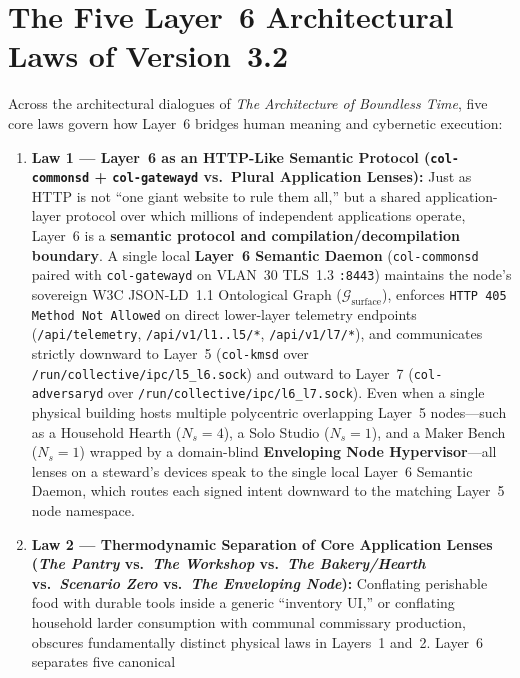 \section*{The Five Layer~6 Architectural Laws of Version~3.2}

Across the architectural dialogues of \textit{The Architecture of Boundless Time}, five core laws
govern how Layer~6 bridges human meaning and cybernetic execution:

\begin{enumerate}
    \item \textbf{Law 1 --- Layer~6 as an HTTP-Like Semantic Protocol (\texttt{col-commonsd} + \texttt{col-gatewayd} vs.\ Plural Application Lenses):}
          Just as HTTP is not ``one giant website to rule them all,'' but a shared application-layer
          protocol over which millions of independent applications operate, Layer~6 is a
          \textbf{semantic protocol and compilation/decompilation boundary}. A single local
          \textbf{Layer~6 Semantic Daemon} (\texttt{col-commonsd} paired with \texttt{col-gatewayd}
          on VLAN~30 TLS~1.3 \texttt{:8443}) maintains the node's sovereign W3C JSON-LD~1.1
          Ontological Graph ($\mathcal{G}_{\mathrm{surface}}$), enforces \texttt{HTTP 405 Method Not
          Allowed} on direct lower-layer telemetry endpoints (\texttt{/api/telemetry},
          \texttt{/api/v1/l1..l5/*}, \texttt{/api/v1/l7/*}), and communicates strictly downward to
          Layer~5 (\texttt{col-kmsd} over \texttt{/run/collective/ipc/l5\_l6.sock}) and outward to
          Layer~7 (\texttt{col-adversaryd} over \texttt{/run/collective/ipc/l6\_l7.sock}). Even when
          a single physical building hosts multiple polycentric overlapping Layer~5 nodes---such as
          a Household Hearth ($N_s=4$), a Solo Studio ($N_s=1$), and a Maker Bench ($N_s=1$) wrapped
          by a domain-blind \textbf{Enveloping Node Hypervisor}---all lenses on a steward's devices
          speak to the single local Layer~6 Semantic Daemon, which routes each signed intent
          downward to the matching Layer~5 node namespace.
    \item \textbf{Law 2 --- Thermodynamic Separation of Core Application Lenses (\textit{The Pantry} vs.\ \textit{The Workshop} vs.\ \textit{The Bakery/Hearth} vs.\ \textit{Scenario Zero} vs.\ \textit{The Enveloping Node}):}
          Conflating perishable food with durable tools inside a generic ``inventory UI,'' or
          conflating household larder consumption with communal commissary production, obscures
          fundamentally distinct physical laws in Layers~1 and~2. Layer~6 separates five canonical

\end{enumerate}
